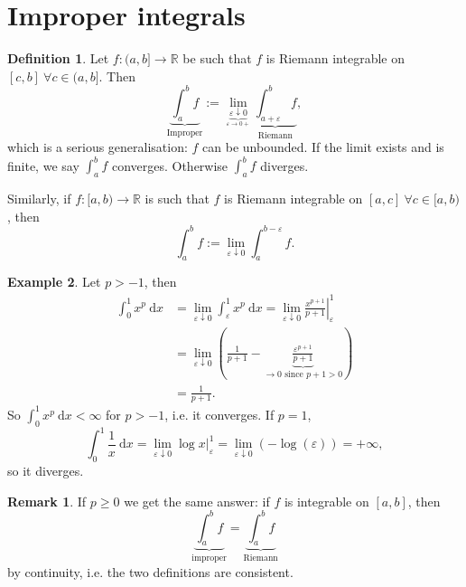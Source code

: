 \documentclass[a4paper]{article}
\theoremstyle{definition}
\newtheorem{defn}{Definition}[subsection]
\newtheorem{example}[defn]{Example}
\newtheorem*{remark}{Remark}
\begin{document}
\section{Improper integrals}
\begin{defn}
Let $f:(a,b]\rightarrow \mathbb R$ be such that $f$ is Riemann integrable on $[c,b] \ \forall c\in (a,b]$. Then
\[
\underbrace{\int_a^b f}_{\text{Improper}}:=\lim_{\underbrace{\varepsilon \downarrow 0}_{\varepsilon \rightarrow 0+}} \underbrace{\int_{a+\varepsilon}^b f}_{\text{Riemann}},
\]
which is a serious generalisation: $f$ can be unbounded. If the limit exists and is finite, we say $\int_a^b f$ converges. Otherwise $\int_a^b f$ diverges.

Similarly, if $f:[a,b)\rightarrow \mathbb R$ is such that $f$ is Riemann integrable on $[a,c] \ \forall c\in [a,b)$, then
\[
\int_a^b f := \lim_{\varepsilon \downarrow 0} \int_a^{b-\varepsilon} f .
\]
\end{defn}
\begin{example}
Let $p>-1$, then
\[
\begin{aligned}
    \int_0^1 x^p \ \mathrm d x &=\lim_{\varepsilon \downarrow 0} \int_\varepsilon^1 x^p \ \mathrm d x=\lim_{\varepsilon \downarrow 0} \left. \frac{x^{p+1}}{p+1} \right|_\varepsilon^1 \\
    &=\lim_{\varepsilon \downarrow 0} \left(\frac{1}{p+1}-\underbrace{\frac{\varepsilon^{p+1}}{p+1}}_{\rightarrow 0\text{ since }p+1>0} \right) \\&= \frac{1}{p+1}.
\end{aligned}
\]
So $\int_0^1 x^p \ \mathrm d x<\infty$ for $p>-1$, i.e. it converges. If $p=1$,
\[
\int_0^1 \frac{1}{x} \ \mathrm d x = \lim_{\varepsilon \downarrow 0} \left. \log x \right|_\varepsilon^1 = \lim_{\varepsilon \downarrow 0} \left(-\log(\varepsilon)\right) = +\infty,
\]
so it diverges.
\end{example}
\begin{remark}
If $p\geq 0$ we get the same answer: if $f$ is integrable on $[a,b]$, then
\[
\underbrace{\int_a^b f}_{\text{improper}} = \underbrace{\int_a^b f}_{\text{Riemann}}
\]
by continuity, i.e. the two definitions are consistent.
\end{remark}
\end{document}
